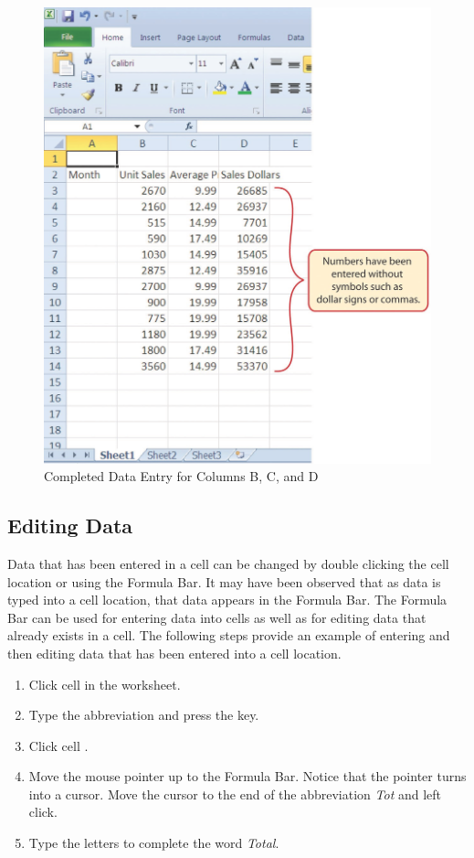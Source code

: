\begin{figure}[H]
	\centering
	\includegraphics[width=\maxwidth{.95\linewidth}]{gfx/ch01_fig16}
	\caption{Completed Data Entry for Columns B, C, and D}
	\label{01:fig16}
\end{figure}

\subsection{Editing Data}

Data that has been entered in a cell can be changed by double clicking the cell location or using the Formula Bar. It may have been observed that as data is typed into a cell location, that data appears in the Formula Bar. The Formula Bar can be used for entering data into cells as well as for editing data that already exists in a cell. The following steps provide an example of entering and then editing data that has been entered into a cell location.

\begin{enumerate}
	\item Click cell  in the  worksheet.
	\item Type the abbreviation  and press the  key.
	\item Click cell .
	\item Move the mouse pointer up to the Formula Bar. Notice that the pointer turns into a cursor. Move the cursor to the end of the abbreviation \textit{Tot} and left click.
	\item Type the letters  to complete the word \textit{Total}.
\end{enumerate}

